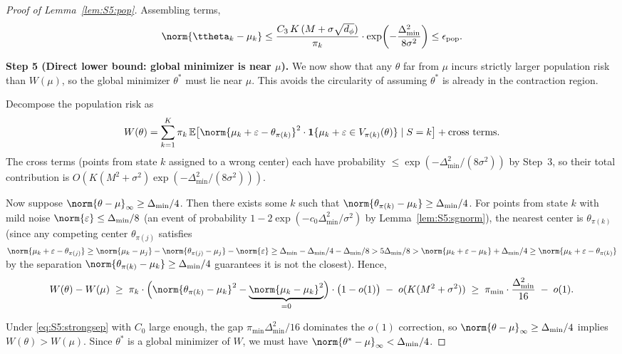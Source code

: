 \begin{proof}[Proof of Lemma~\ref{lem:S5:pop}]
Assembling terms,
\[
\norm{\ttheta_k-\muk}
\le \frac{C_3\,K\,(M+\sigma\sqrt{d_\phi})}{\pi_k}
    \cdot\exp\!\left(-\frac{\Delta_{\min}^2}{8\sigma^2}\right)
\le \epsilon_{\mathrm{pop}}.
\]

\noindent\textbf{Step 5 (Direct lower bound: global minimizer is near $\mu$).}
We now show that any $\theta$ far from $\mu$ incurs strictly larger
population risk than $W(\mu)$, so the global minimizer $\theta^*$ must
lie near $\mu$.  This avoids the circularity of assuming $\theta^*$ is
already in the contraction region.

Decompose the population risk as
\[
W(\theta)=\sum_{k=1}^K\pi_k\,
          \E\bigl[\norm{\mu_k+\varepsilon-\theta_{\pi(k)}}^2\cdot
                   \ind\{\mu_k+\varepsilon\in V_{\pi(k)}(\theta)\}\mid S=k\bigr]
          +\text{cross terms}.
\]
The cross terms (points from state $k$ assigned to a wrong center) each
have probability $\le\exp(-\Delta_{\min}^2/(8\sigma^2))$ by Step~3, so
their total contribution is $O(K(M^2+\sigma^2)\exp(-\Delta_{\min}^2/(8\sigma^2)))$.

Now suppose $\norm{\theta-\mu}_\infty\ge\Delta_{\min}/4$.  Then there
exists some $k$ such that $\norm{\theta_{\pi(k)}-\mu_k}\ge\Delta_{\min}/4$.
For points from state $k$ with mild noise
$\norm{\varepsilon}\le\Delta_{\min}/8$ (an event of probability
$1-2\exp(-c_0\Delta_{\min}^2/\sigma^2)$ by Lemma~\ref{lem:S5:sgnorm}),
the nearest center is $\theta_{\pi(k)}$ (since any competing center
$\theta_{\pi(j)}$ satisfies
$\norm{\mu_k+\varepsilon-\theta_{\pi(j)}}\ge
 \norm{\mu_k-\mu_j}-\norm{\theta_{\pi(j)}-\mu_j}-\norm{\varepsilon}
 \ge\Delta_{\min}-\Delta_{\min}/4-\Delta_{\min}/8>5\Delta_{\min}/8
 >\norm{\mu_k+\varepsilon-\mu_k}+\Delta_{\min}/4
 \ge\norm{\mu_k+\varepsilon-\theta_{\pi(k)}}$ by the separation
$\norm{\theta_{\pi(k)}-\mu_k}\ge\Delta_{\min}/4$ guarantees it is not
the closest).  Hence,
\[
W(\theta)-W(\mu)
\;\ge\; \pi_k\cdot\Bigl(
        \norm{\theta_{\pi(k)}-\mu_k}^2
        -\underbrace{\norm{\mu_k-\mu_k}^2}_{=0}
        \Bigr)\cdot\bigl(1-o(1)\bigr)
        \;-\; o(K(M^2+\sigma^2))
\;\ge\; \pi_{\min}\cdot\frac{\Delta_{\min}^2}{16}
        \;-\; o(1).
\]

Under \eqref{eq:S5:strongsep} with $C_0$ large enough, the gap
$\pi_{\min}\Delta_{\min}^2/16$ dominates the $o(1)$ correction,
so $\norm{\theta-\mu}_\infty\ge\Delta_{\min}/4$ implies
$W(\theta)>W(\mu)$.  Since $\theta^*$ is a global minimizer of $W$,
we must have $\norm{\theta^*-\mu}_\infty<\Delta_{\min}/4$.


\end{proof}
